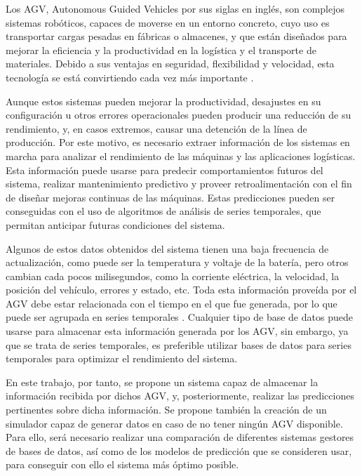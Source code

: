 

Los AGV, Autonomous Guided Vehicles por sus siglas en inglés, son complejos sistemas robóticos, 
capaces de moverse en un entorno concreto, cuyo uso es transportar cargas pesadas en fábricas o 
almacenes, y que están diseñados para mejorar la eficiencia y la productividad en la logística 
y el transporte de materiales. Debido a sus ventajas en seguridad, flexibilidad y velocidad,
esta tecnología se está convirtiendo cada vez más importante \cite{espinosa2020transporte}.

Aunque estos sistemas pueden mejorar la productividad, desajustes en su configuración u otros
errores operacionales pueden producir una reducción de su rendimiento, y, en casos extremos,
causar una detención de la línea de producción. Por este motivo, es necesario extraer información
de los sistemas en marcha para analizar el rendimiento de las máquinas y las aplicaciones logísticas.
Esta información puede usarse para predecir comportamientos futuros del sistema, realizar mantenimiento
predictivo y proveer retroalimentación con el fin de diseñar mejoras continuas de las máquinas. Estas
predicciones pueden ser conseguidas con el uso de algoritmos de análisis de series temporales, que
permitan anticipar futuras condiciones del sistema. \cite{BARUQUE201949}

Algunos de estos datos obtenidos del sistema tienen una baja frecuencia de actualización, como puede
ser la temperatura y voltaje de la batería, pero otros cambian cada pocos milisegundos, como la
corriente eléctrica, la velocidad, la posición del vehículo, errores y estado, etc. Toda esta
información proveída por el AGV debe estar relacionada con el tiempo en el que fue generada, por
lo que puede ser agrupada en series temporales \cite{DBLP:journals/corr/abs-2104-00164}. Cualquier
tipo de base de datos puede usarse para almacenar esta información generada por los AGV, sin embargo,
ya que se trata de series temporales, es preferible utilizar bases de datos para series temporales
para optimizar el rendimiento del sistema.

En este trabajo, por tanto, se propone un sistema capaz de almacenar la información recibida por dichos 
AGV, y, posteriormente, realizar las predicciones pertinentes sobre dicha información. Se propone también
la creación de un simulador capaz de generar datos en caso de no tener ningún AGV disponible. Para ello,
será necesario realizar una comparación de diferentes sistemas gestores de bases de datos, así como de
los modelos de predicción que se consideren usar, para conseguir con ello el sistema más óptimo posible.